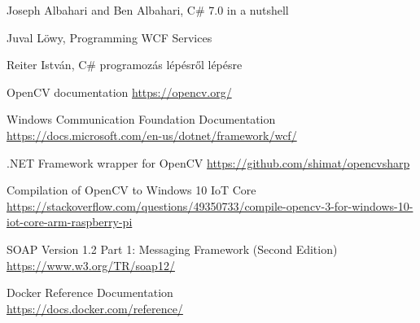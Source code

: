 \begin{thebibliography}{4}

Joseph Albahari and Ben Albahari, C\# 7.0 in a nutshell 

Juval Löwy, Programming WCF Services

 Reiter István, C\# programozás lépésről lépésre 

 OpenCV documentation \url{https://opencv.org/}

 Windows Communication Foundation Documentation \url{https://docs.microsoft.com/en-us/dotnet/framework/wcf/}

 .NET Framework wrapper for OpenCV \url{https://github.com/shimat/opencvsharp}

 Compilation of OpenCV to Windows 10 IoT Core \\ \url{https://stackoverflow.com/questions/49350733/compile-opencv-3-for-windows-10-iot-core-arm-raspberry-pi}

 SOAP Version 1.2 Part 1: Messaging Framework (Second Edition) \\ 
\url{https://www.w3.org/TR/soap12/}

 Docker Reference Documentation \\ \url{https://docs.docker.com/reference/}

\end{thebibliography}

